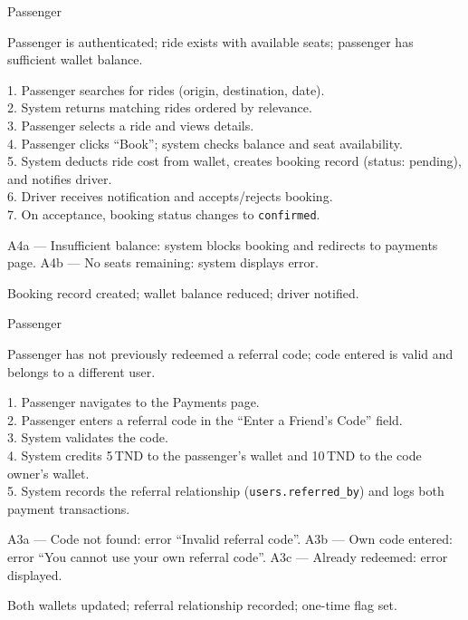 \documentclass[12pt,a4paper,openright]{report}
\newenvironment{ucbox}[1]{%
  \begin{tcolorbox}[title=#1, colback=fdnavy!3, colframe=fdnavy,
    fonttitle=\bfseries, breakable]%
}{%
  \end{tcolorbox}%
}
\begin{document}
\begin{ucbox}{UC-03: Book a Ride}
\begin{description}[noitemsep, font=\bfseries, leftmargin=3.5cm]
\item[Actor:] Passenger
\item[Pre-condition:] Passenger is authenticated; ride exists with available seats; passenger has sufficient wallet balance.
\item[Main Flow:]
    1. Passenger searches for rides (origin, destination, date).\\
    2. System returns matching rides ordered by relevance.\\
    3. Passenger selects a ride and views details.\\
    4. Passenger clicks ``Book''; system checks balance and seat availability.\\
    5. System deducts ride cost from wallet, creates booking record (status: pending), and notifies driver.\\
    6. Driver receives notification and accepts/rejects booking.\\
    7. On acceptance, booking status changes to \texttt{confirmed}.
\item[Alternative Flow:] A4a — Insufficient balance: system blocks booking and redirects to payments page. A4b — No seats remaining: system displays error.
\item[Post-condition:] Booking record created; wallet balance reduced; driver notified.
\end{description}
\end{ucbox}

\vspace{0.5cm}

\begin{ucbox}{UC-04: Redeem Referral Code}
\begin{description}[noitemsep, font=\bfseries, leftmargin=3.5cm]
\item[Actor:] Passenger
\item[Pre-condition:] Passenger has not previously redeemed a referral code; code entered is valid and belongs to a different user.
\item[Main Flow:]
    1. Passenger navigates to the Payments page.\\
    2. Passenger enters a referral code in the ``Enter a Friend's Code'' field.\\
    3. System validates the code.\\
    4. System credits 5\,TND to the passenger's wallet and 10\,TND to the code owner's wallet.\\
    5. System records the referral relationship (\texttt{users.referred\_by}) and logs both payment transactions.
\item[Alternative Flow:] A3a — Code not found: error ``Invalid referral code''. A3b — Own code entered: error ``You cannot use your own referral code''. A3c — Already redeemed: error displayed.
\item[Post-condition:] Both wallets updated; referral relationship recorded; one-time flag set.
\end{description}
\end{ucbox}
\end{document}
